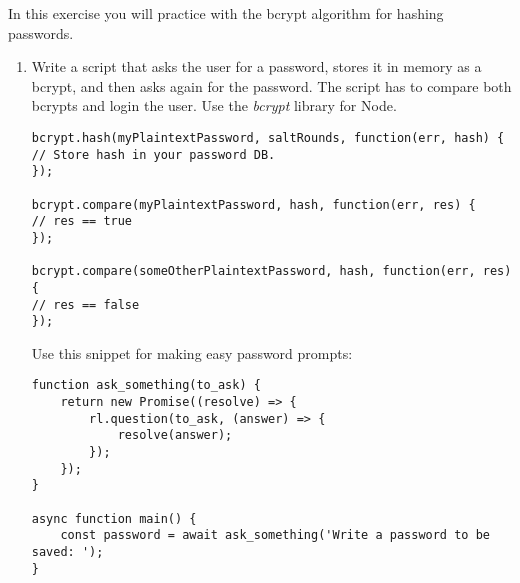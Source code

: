 \begin{Exercise}[label={basic-js-crypto-bcrypt}]
In this exercise you will practice with the bcrypt algorithm for hashing passwords.

\begin{enumerate}[1.]
\item Write a script that asks the user for a password, stores it in memory as a bcrypt, and then asks again for the password. The script has to compare both bcrypts and login the user. Use the \textit{bcrypt} library for Node.

\begin{lstlisting}[style=JavaScript]
bcrypt.hash(myPlaintextPassword, saltRounds, function(err, hash) {
// Store hash in your password DB.
});

bcrypt.compare(myPlaintextPassword, hash, function(err, res) {
// res == true
});

bcrypt.compare(someOtherPlaintextPassword, hash, function(err, res) {
// res == false
});
\end{lstlisting}

Use this snippet for making easy password prompts:
\begin{lstlisting}[style=JavaScript]
function ask_something(to_ask) {
	return new Promise((resolve) => {
		rl.question(to_ask, (answer) => {
			resolve(answer);
		});
	});
}

async function main() {
	const password = await ask_something('Write a password to be saved: ');
}
\end{lstlisting}
\end{enumerate}
\end{Exercise}

